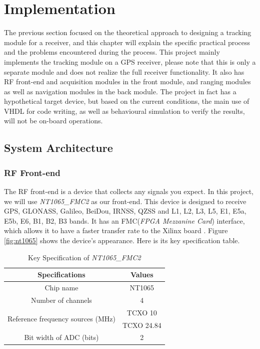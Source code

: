 \myClearDoublePage
\chapter{Implementation}

The previous section focused on the theoretical approach to designing a tracking module for a receiver, and this chapter will explain the specific practical process and the problems encountered during the process. This project mainly implements the tracking module on a GPS receiver, please note that this is only a separate module and does not realize the full receiver functionality. It also has RF front-end and acquisition modules in the front module, and ranging modules as well as navigation modules in the back module. The project in fact has a hypothetical target device, but based on the current conditions, the main use of VHDL for code writing, as well as behavioural simulation to verify the results, will not be on-board operations.

\section{System Architecture}
\subsection{RF Front-end}
The RF front-end is a device that collects any signals you expect. In this project, we will use \textit{NT1065\_FMC2} as our front-end. This device is designed to receive GPS, GLONASS, Galileo, BeiDou, IRNSS, QZSS and L1, L2, L3, L5, E1, E5a, E5b, E6, B1, B2, B3 bands. It has an FMC(\textit{FPGA Mezzanine Card}) interface, which allows it to have a faster transfer rate to the Xilinx board \cite{RN206}. Figure \ref{fig:nt1065} shows the device's appearance. Here is its key specification table.

\begin{table}[!htbp]
\centering
\caption{Key Specification of \textit{NT1065\_FMC2}}\label{tab:nt1065}
\renewcommand\arraystretch{1.5}
\begin{tabular}{cc}
    \toprule
    Specifications & Values \\
    \midrule
    Chip name & NT1065 \\
    Number of channels & 4 \\
    \multirow{2}{*}{Reference frequency sources (MHz)} & TCXO 10 \\
     & TCXO 24.84 \\
    Bit width of ADC (bits) & 2 \\
    \bottomrule
\end{tabular}
\end{table}

